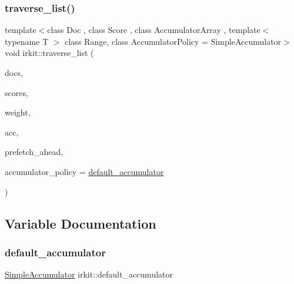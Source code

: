 \mbox{\label{namespaceirkit_a80010d3825abc594bcd8fcc8225804d2}} 
\subsubsection{\texorpdfstring{traverse\+\_\+list()}{traverse\_list()}\hspace{0.1cm}{\footnotesize\ttfamily [2/2]}}
{\footnotesize\ttfamily template$<$class Doc , class Score , class Accumulator\+Array , template$<$ typename T $>$ class Range, class Accumulator\+Policy  = Simple\+Accumulator$>$ \\
void irkit\+::traverse\+\_\+list (\begin{DoxyParamCaption}\item[{const Range$<$ Doc $>$ \&}]{docs,  }\item[{const Range$<$ Score $>$ \&}]{scores,  }\item[{Score}]{weight,  }\item[{Accumulator\+Array \&}]{acc,  }\item[{unsigned int}]{prefetch\+\_\+ahead,  }\item[{Accumulator\+Policy \&}]{accumulator\+\_\+policy = {\ttfamily \hyperlink{namespaceirkit_a823671564bf545991e9708011e4a8df1}{default\+\_\+accumulator}} }\end{DoxyParamCaption})}



\subsection{Variable Documentation}
\mbox{\label{namespaceirkit_a823671564bf545991e9708011e4a8df1}} 
\subsubsection{\texorpdfstring{default\+\_\+accumulator}{default\_accumulator}}
{\footnotesize\ttfamily \hyperlink{classirkit_1_1SimpleAccumulator}{Simple\+Accumulator} irkit\+::default\+\_\+accumulator}

